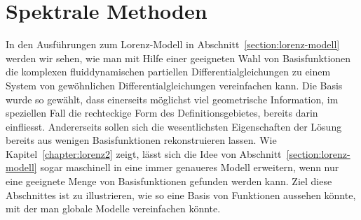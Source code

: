 %
%
%
\section{Spektrale Methoden\label{section:spektrale methoden}}
In den Ausführungen zum Lorenz-Modell in Abschnitt~\ref{section:lorenz-modell}
werden wir sehen,
wie man mit Hilfe einer geeigneten Wahl von Basisfunktionen
die komplexen fluiddynamischen partiellen Differentialgleichungen zu einem
System von gewöhnlichen Differentialgleichungen vereinfachen kann.
Die Basis wurde so gewählt, dass einerseits möglichst viel geometrische
Information, im speziellen Fall die rechteckige Form des Definitionsgebietes,
bereits darin einfliesst.
Andererseits sollen sich die wesentlichsten Eigenschaften der Lösung bereits
aus wenigen Basisfunktionen rekonstruieren lassen.
Wie Kapitel~\ref{chapter:lorenz2} zeigt, lässt sich die Idee von
Abschnitt~\ref{section:lorenz-modell} sogar maschinell in eine
immer genaueres Modell erweitern, wenn nur eine geeignete Menge
von Basisfunktionen gefunden werden kann.
Ziel diese Abschnittes ist zu illustrieren, wie so eine Basis von
Funktionen aussehen könnte, mit der man globale Modelle vereinfachen
könnte.







